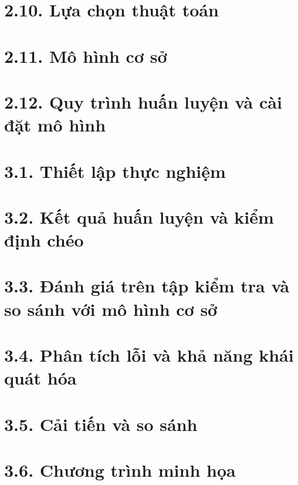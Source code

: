\section{2.10. Lựa chọn thuật toán}

\emptyspace

\section{2.11. Mô hình cơ sở}

\emptyspace

\section{2.12. Quy trình huấn luyện và cài đặt mô hình}

\emptyspace


\section{3.1. Thiết lập thực nghiệm}

\emptyspace

\section{3.2. Kết quả huấn luyện và kiểm định chéo}

\emptyspace

\section{3.3. Đánh giá trên tập kiểm tra và so sánh với mô hình cơ sở}

\emptyspace

\section{3.4. Phân tích lỗi và khả năng khái quát hóa}

\emptyspace

\section{3.5. Cải tiến và so sánh}

\emptyspace

\section{3.6. Chương trình minh họa}

